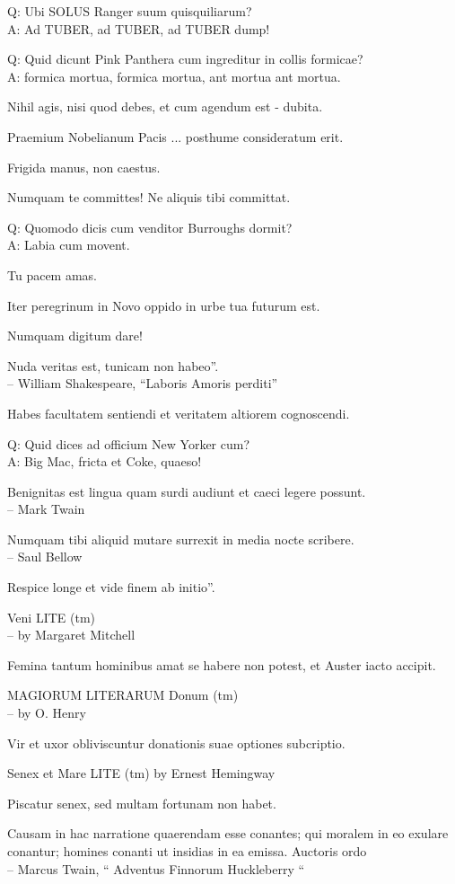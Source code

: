 \documentclass[titlepage,12pt]{memoir}
\begin{document}
Q: Ubi SOLUS Ranger suum quisquiliarum?\\
A: Ad TUBER, ad TUBER, ad TUBER dump!

Q: Quid dicunt Pink Panthera cum ingreditur in collis formicae?\\
A: formica mortua, formica mortua, ant mortua ant mortua.

Nihil agis, nisi quod debes, et cum agendum est - dubita.

Praemium Nobelianum Pacis ... posthume consideratum erit.

Frigida manus, non caestus.

Numquam te committes! Ne aliquis tibi committat.

Q: Quomodo dicis cum venditor Burroughs dormit?\\
A: Labia cum movent.

Tu pacem amas.

Iter peregrinum in Novo oppido in urbe tua futurum est.

Numquam digitum dare!

Nuda veritas est, tunicam non habeo”.
\\-- William Shakespeare, “Laboris Amoris perditi”

Habes facultatem sentiendi et veritatem altiorem cognoscendi.

Q: Quid dices ad officium New Yorker cum?\\
A: Big Mac, fricta et Coke, quaeso!

 Benignitas est lingua quam surdi audiunt et caeci legere possunt.
\\-- Mark Twain

Numquam tibi aliquid mutare surrexit in media nocte
scribere.
\\-- Saul Bellow

Respice longe et vide finem ab initio”.

Veni LITE (tm)
\\-- by Margaret Mitchell

Femina tantum hominibus amat se habere non potest, et Auster iacto accipit.

MAGIORUM LITERARUM Donum (tm)
\\-- by O. Henry

Vir et uxor obliviscuntur donationis suae optiones subcriptio.

Senex et Mare LITE (tm)
by Ernest Hemingway

Piscatur senex, sed multam fortunam non habet.

 Causam in hac narratione quaerendam esse conantes;
qui moralem in eo exulare conantur; homines conanti
ut insidias in ea emissa. Auctoris ordo
\\-- Marcus Twain, “ Adventus Finnorum Huckleberry “
\end{document}
